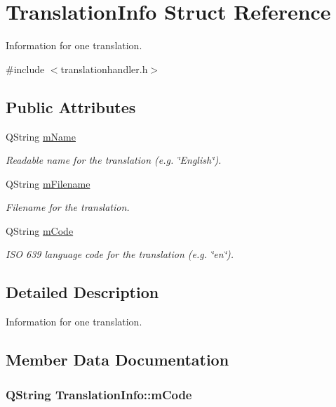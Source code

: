 \hypertarget{struct_translation_info}{\section{Translation\-Info Struct Reference}
\label{struct_translation_info}
}


Information for one translation.  




{\ttfamily \#include $<$translationhandler.\-h$>$}

\subsection*{Public Attributes}
\begin{DoxyCompactItemize}
\item 
Q\-String \hyperlink{struct_translation_info_a20c7a02f7bfcdd68a82cf3959cda4435}{m\-Name}
\begin{DoxyCompactList}\small\item\em Readable name for the translation (e.\-g. \char`\"{}\-English\char`\"{}). \end{DoxyCompactList}\item 
Q\-String \hyperlink{struct_translation_info_aa5387596bce8820968bde2e257c103c1}{m\-Filename}
\begin{DoxyCompactList}\small\item\em Filename for the translation. \end{DoxyCompactList}\item 
Q\-String \hyperlink{struct_translation_info_a7fe7765aaa8524645d65e7ffb348a283}{m\-Code}
\begin{DoxyCompactList}\small\item\em I\-S\-O 639 language code for the translation (e.\-g. \char`\"{}en\char`\"{}). \end{DoxyCompactList}\end{DoxyCompactItemize}


\subsection{Detailed Description}
Information for one translation. 

\subsection{Member Data Documentation}
\hypertarget{struct_translation_info_a7fe7765aaa8524645d65e7ffb348a283}{
\subsubsection[{m\-Code}]{\setlength{\rightskip}{0pt plus 5cm}Q\-String Translation\-Info\-::m\-Code}}\label{struct_translation_info_a7fe7765aaa8524645d65e7ffb348a283}


